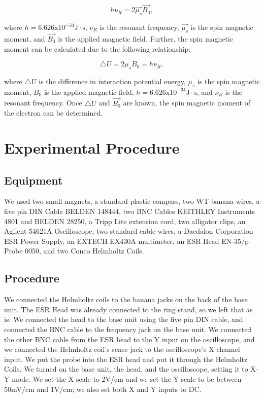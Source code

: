 \documentclass[twoside,10pt]{article}
\begin{document}
\begin{multicols}{2}
		\begin{equation}
			h \nu_R = 2 \vec{\mu_s} \vec{B_0},
		\end{equation}
		
		\noindent where $h = 6.626 \text{x} 10^{-34} \text{J} \cdot \text{s}$, $\nu_R$ is the resonant frequency, 
		$\vec{\mu_s}$ is the spin magnetic moment, and $\vec{B_0}$ is the applied magnetic field. Further, the spin magnetic moment can be calculated due to the following relationship:
		
		\begin{equation}
		\triangle U = 2 \mu_s B_0 = h\nu_R,
		\end{equation}
		
		where $\triangle U$ is the difference in interaction potential energy, $\mu_s$ is the spin magnetic moment, $B_0$ is the applied magnetic field, $h = 6.626 \text{x} 10^{-34} \text{J} \cdot \text{s}$, and $\nu_R$ is the resonant frequency. Once $\triangle U$ and $\vec{B_0}$ are known, the spin magnetic moment of the electron can be determined. 
		
		
		
		\section{Experimental Procedure}
		
		\subsection*{Equipment}
		We used two small magnets, a standard plastic compass, two WT banana wires, a five pin DIN Cable BELDEN 148444, two BNC Cables KEITHLEY Instruments 4801 and BELDEN 28250, a Tripp Lite extension cord, two alligator clips, an Agilent 54621A Oscilloscope, two standard cable wires, a Daedalon Corporation ESR Power Supply, an EXTECH EX430A multimeter, an ESR Head EN-35/p Probe 0050, and two Conco Helmholtz Coils. 

		\subsection*{Procedure}
		
		\indent We connected the Helmholtz coils to the banana jacks on the back of the base unit. The ESR Head was already connected to the ring stand, so we left that as is. We connected the head to the base unit using the five pin DIN cable, and connected the BNC cable to the frequency jack on the base unit. We connected the other BNC cable from the ESR head to the Y input on the oscilloscope, and we connected the Helmholtz coil's sense jack to the oscilloscope's X channel input. We put the probe into the ESR head and put it through the Helmholtz Coils. We turned on the base unit, the head, and the oscilloscope, setting it to X-Y mode. We set the X-scale to 2V/cm and we set the Y-scale to be between 50mV/cm and 1V/cm; we also set both X and Y inputs to DC. 
		

\end{multicols}
\end{document}
